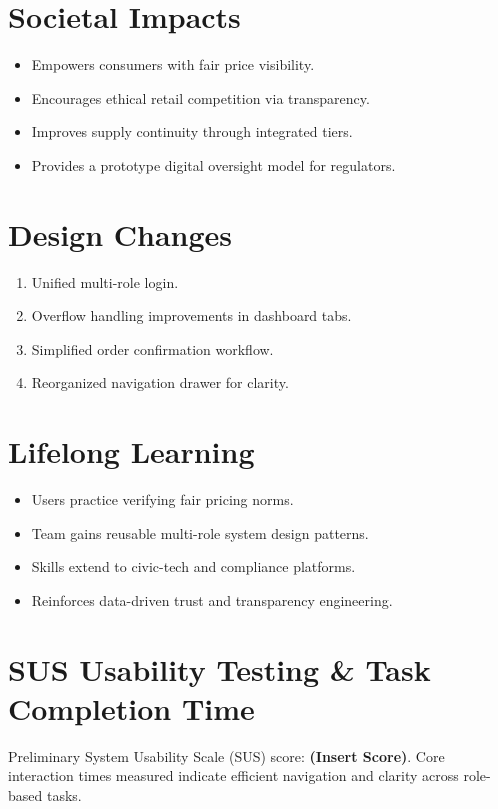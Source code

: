 \documentclass[12pt,a4paper]{article}
\begin{document}
\section{Societal Impacts}
\begin{itemize}
  \item Empowers consumers with fair price visibility.
  \item Encourages ethical retail competition via transparency.
  \item Improves supply continuity through integrated tiers.
  \item Provides a prototype digital oversight model for regulators.
\end{itemize}

\section{Design Changes}
\begin{enumerate}
  \item Unified multi-role login.
  \item Overflow handling improvements in dashboard tabs.
  \item Simplified order confirmation workflow.
  \item Reorganized navigation drawer for clarity.
\end{enumerate}

\section{Lifelong Learning}
\begin{itemize}
  \item Users practice verifying fair pricing norms.
  \item Team gains reusable multi-role system design patterns.
  \item Skills extend to civic-tech and compliance platforms.
  \item Reinforces data-driven trust and transparency engineering.
\end{itemize}

\section{SUS Usability Testing \& Task Completion Time}
Preliminary System Usability Scale (SUS) score: \textbf{(Insert Score)}. Core interaction times measured indicate efficient navigation and clarity across role-based tasks.
\end{document}
